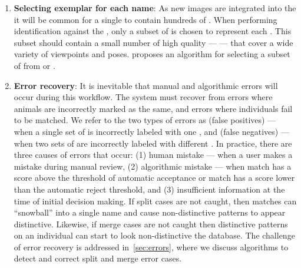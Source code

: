 \begin{enumerate}
            \bridgethegap{}

        \item \textbf{Selecting exemplar \annots{} for each name}:
            As new images are integrated into the \masterdatabase{} it will be
              common for a single \name{} to contain hundreds of \annots{}.
            When performing identification against the \masterdatabase{}, only
              a subset of \annots{} is chosen to represent each \name{}.
            This subset should contain a small number of high quality
              \annots{} --- \glossterm{\exemplars{}} --- that cover a wide
              variety of viewpoints and poses.
             proposes an algorithm for selecting a
              subset of \exemplar{} \annots{} from \aan{\encounter{}} or
              \aan{\name{}}.

        \item \textbf{Error recovery}:
            It is inevitable that manual and algorithmic errors will occur
              during this workflow.
            The system must recover from errors where animals are incorrectly
              marked as the same, and errors where individuals fail to be
              matched.
            We refer to the two types of errors as %
             (false positives) --- when a single set of
              \annot{} is incorrectly labeled with one \name{}, and %
             (false negatives) --- when two sets of
              \annots{} are incorrectly labeled with different \names{}.
            In practice, there are three causes of errors that occur:
            (1) human mistake --- when a user makes a mistake during manual
              review,
            (2) algorithmic mistake --- when \aan{\groundfalse{}} match has a
              score above the threshold of automatic acceptance or
              \aan{\groundtrue{}} match has a score lower than the automatic
              reject threshold, and
            (3) insufficient information at the time of initial decision
              making.
            If split cases are not caught, then \groundfalse{} matches can
              ``snowball'' into a single name and cause non-distinctive patterns
              to appear distinctive.
            Likewise, if merge cases are not caught then \groundtrue{}
              distinctive patterns on an individual can start to look
              non-distinctive \wrt{} the database.
            The challenge of error recovery is addressed in~\cref{sec:errors},
              where we discuss algorithms to detect and correct split and merge
              error cases.


\end{enumerate}
